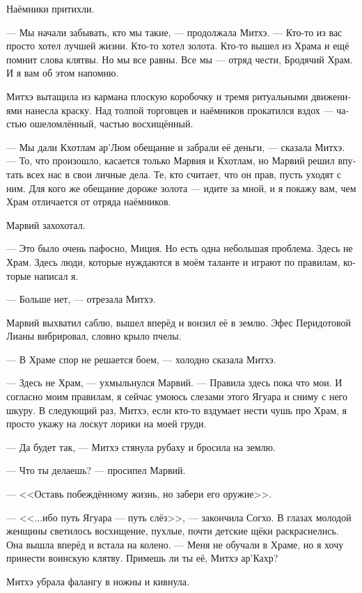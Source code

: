 \documentclass[a4paper,12pt,fleqn]{book}\usepackage{polyglossia}\setdefaultlanguage[babelshorthands=true]{russian}\setotherlanguage{english}\defaultfontfeatures{Ligatures=TeX,Mapping=tex-text}\usepackage{xcolor}\newcommand{\ml}[3]{#2}
\newcommand{\asterism}{\vspace{1em}{\centering\Large\bfseries$\ast~\ast~\ast$\par}\vspace{1em}}
\begin{document}
Наёмники притихли.

--- Мы начали забывать, кто мы такие, --- продолжала Митхэ.
--- Кто-то из вас просто хотел лучшей жизни.
Кто-то хотел золота.
Кто-то вышел из Храма и ещё помнит слова клятвы.
Но мы все равны.
Все мы --- отряд чести, Бродячий Храм.
И я вам об этом напомню.

Митхэ вытащила из кармана плоскую коробочку и тремя ритуальными движениями нанесла краску.
Над толпой торговцев и наёмников прокатился вздох --- частью ошеломлённый, частью восхищённый.

--- Мы дали Кхотлам ар'Люм обещание и забрали её деньги, --- сказала Митхэ.
--- То, что произошло, касается только Марвия и Кхотлам, но Марвий решил впутать всех нас в свои личные дела.
Те, кто считает, что он прав, пусть уходят с ним.
Для кого же обещание дороже золота --- идите за мной, и я покажу вам, чем Храм отличается от отряда наёмников.

Марвий захохотал.

--- Это было очень пафосно, Миция.
Но есть одна небольшая проблема.
Здесь не Храм.
Здесь люди, которые нуждаются в моём таланте и играют по правилам, которые написал я.

--- Больше нет, --- отрезала Митхэ.

Марвий выхватил саблю, вышел вперёд и вонзил её в землю.
Эфес Перидотовой Лианы вибрировал, словно крыло пчелы.

--- В Храме спор не решается боем, --- холодно сказала Митхэ.

--- Здесь не Храм, --- ухмыльнулся Марвий.
--- Правила здесь пока что мои.
И согласно моим правилам, я сейчас умоюсь слезами этого Ягуара и сниму с него шкуру.
В следующий раз, Митхэ, если кто-то вздумает нести чушь про Храм, я просто укажу на лоскут лорики на моей груди.

--- Да будет так, --- Митхэ стянула рубаху и бросила на землю.

\asterism

--- Что ты делаешь? --- просипел Марвий.

--- <<Оставь побеждённому жизнь, но забери его оружие>>.

--- <<...ибо путь Ягуара --- путь слёз>>, --- закончила Согхо.
В глазах молодой женщины светилось восхищение, пухлые, почти детские щёки раскраснелись.
Она вышла вперёд и встала на колено.
--- Меня не обучали в Храме, но я хочу принести воинскую клятву.
Примешь ли ты её, Митхэ ар'Кахр?

Митхэ убрала фалангу в ножны и кивнула.
\end{document}
